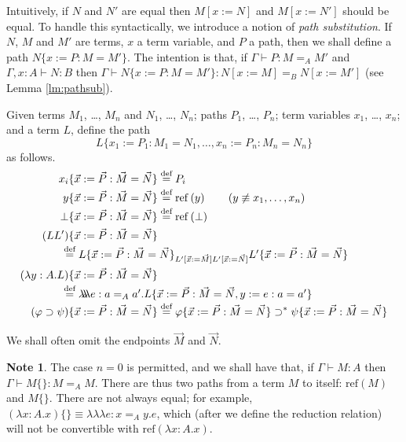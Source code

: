 \documentclass[a4paper,UKenglish]{lipics-v2016}
\newcommand*{\eqdef}{\mathrel{\smash{\stackrel{\text{def}}{=}}}}
\newcommand*{\reff}[1]{\ensuremath{\mathrm{ref} \left( {#1} \right)}}
\newcommand*{\triplelambda}{\ensuremath{\lambda \!\! \lambda \!\! \lambda}}
\theoremstyle{plain}
\theoremstyle{definition}
\newtheorem{note}[theorem]{Note}
\begin{document}
Intuitively, if $N$ and $N'$ are equal then $M[x:=N]$ and $M[x:=N']$ should be equal.  To handle this syntactically,
we introduce a notion of \emph{path substitution}.  If $N$, $M$ and $M'$ are terms, $x$ a term variable, and $P$ a path, then we shall define a path $N \{ x := P : M = M' \}$.  The intention is that, if
$\Gamma \vdash P : M =_A M'$ and $\Gamma, x : A \vdash N : B$ then $\Gamma \vdash N \{ x := P : M = M' \} : N [ x:= M ] =_B N [ x := M' ]$ (see Lemma \ref{lm:pathsub}). 

\begin{definition}
Given terms $M_1$, \ldots, $M_n$ and $N_1$, \ldots, $N_n$; paths $P_1$, \ldots, $P_n$; term variables $x_1$, \ldots, $x_n$; and a term $L$, define the path $$L \{ x_1 := P_1 : M_1 = N_1 , \ldots, x_n := P_n : M_n = N_n \}$$ as follows.
\begin{align*}
x_i \{ \vec{x} := \vec{P} : \vec{M} = \vec{N} \} & \eqdef P_i \\
y \{ \vec{x} := \vec{P} : \vec{M} = \vec{N} \} & \eqdef \reff{y} \qquad (y \not\equiv x_1, \ldots, x_n) \\
\bot \{ \vec{x} := \vec{P} : \vec{M} = \vec{N} \} & \eqdef \reff{\bot} \\
(LL') \{ \vec{x} := \vec{P} : \vec{M} = \vec{N} \} \\
\omit\rlap{\qquad \qquad $\eqdef L \{ \vec{x} := \vec{P} : \vec{M} = \vec{N} \}_{L' [\vec{x} := \vec{M}] L' [\vec{x} := \vec{N}]} L' \{ \vec{x} := \vec{P} : \vec{M} = \vec{N} \}$} \\
(\lambda y:A.L) \{ \vec{x} := \vec{P} : \vec{M} = \vec{N} \} & \\
\omit\rlap{\qquad\qquad $\eqdef \triplelambda e : a =_A a' . L \{ \vec{x} := \vec{P} : \vec{M} = \vec{N} , y := e : a = a' \}$} \\
(\varphi \supset \psi) \{ \vec{x} := \vec{P} : \vec{M} = \vec{N} \} & \eqdef \varphi \{ \vec{x} := \vec{P} : \vec{M} = \vec{N} \} \supset^* \psi \{ \vec{x} := \vec{P} : \vec{M} = \vec{N} \}
\end{align*}
\end{definition}

We shall often omit the endpoints $\vec{M}$ and $\vec{N}$.

\begin{note}
The case $n = 0$ is permitted, and we shall have that, if $\Gamma \vdash M : A$ then $\Gamma \vdash M \{\} : M =_A M$.  There are thus two paths from a term $M$ to itself: $\reff{M}$ and $M \{\}$.  There are not always equal; for example, $(\lambda x:A.x) \{\} \equiv \triplelambda e : x =_A y. e$, which (after we define the reduction relation) will not be convertible with $\reff{\lambda x:A.x}$.
\end{note}
\end{document}
